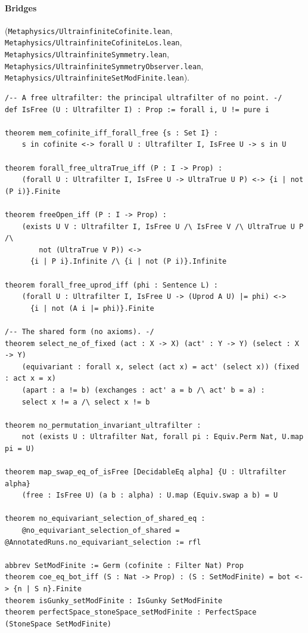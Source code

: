 \documentclass[]{article}
\theoremstyle{definition}
\theoremstyle{remark}
\newcommand{\lpath}[1]{{\ttfamily\nolinkurl{#1}}}
\newcommand{\meta}[1]{\lpath{Metaphysics/#1.lean}}
\begin{document}
\paragraph{Bridges} (\meta{UltrainfiniteCofinite}, \meta{UltrainfiniteCofiniteLos},
\meta{UltrainfiniteSymmetry}, \meta{UltrainfiniteSymmetryObserver}, \meta{UltrainfiniteSetModFinite}).
\begin{lstlisting}
/-- A free ultrafilter: the principal ultrafilter of no point. -/
def IsFree (U : Ultrafilter I) : Prop := forall i, U != pure i

theorem mem_cofinite_iff_forall_free {s : Set I} :
    s in cofinite <-> forall U : Ultrafilter I, IsFree U -> s in U

theorem forall_free_ultraTrue_iff (P : I -> Prop) :
    (forall U : Ultrafilter I, IsFree U -> UltraTrue U P) <-> {i | not (P i)}.Finite

theorem freeOpen_iff (P : I -> Prop) :
    (exists U V : Ultrafilter I, IsFree U /\ IsFree V /\ UltraTrue U P /\
        not (UltraTrue V P)) <->
      {i | P i}.Infinite /\ {i | not (P i)}.Infinite

theorem forall_free_uprod_iff (phi : Sentence L) :
    (forall U : Ultrafilter I, IsFree U -> (Uprod A U) |= phi) <->
      {i | not (A i |= phi)}.Finite

/-- The shared form (no axioms). -/
theorem select_ne_of_fixed (act : X -> X) (act' : Y -> Y) (select : X -> Y)
    (equivariant : forall x, select (act x) = act' (select x)) (fixed : act x = x)
    (apart : a != b) (exchanges : act' a = b /\ act' b = a) :
    select x != a /\ select x != b

theorem no_permutation_invariant_ultrafilter :
    not (exists U : Ultrafilter Nat, forall pi : Equiv.Perm Nat, U.map pi = U)

theorem map_swap_eq_of_isFree [DecidableEq alpha] {U : Ultrafilter alpha}
    (free : IsFree U) (a b : alpha) : U.map (Equiv.swap a b) = U

theorem no_equivariant_selection_of_shared_eq :
    @no_equivariant_selection_of_shared = @AnnotatedRuns.no_equivariant_selection := rfl

abbrev SetModFinite := Germ (cofinite : Filter Nat) Prop
theorem coe_eq_bot_iff (S : Nat -> Prop) : (S : SetModFinite) = bot <-> {n | S n}.Finite
theorem isGunky_setModFinite : IsGunky SetModFinite
theorem perfectSpace_stoneSpace_setModFinite : PerfectSpace (StoneSpace SetModFinite)
\end{lstlisting}
\end{document}
